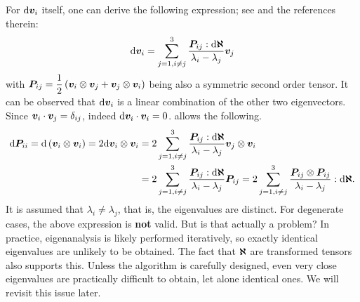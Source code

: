 For $\mathrm{d}\bm{v}_i$ itself, one can derive the following expression; see \cite{Wu2006} and the references therein:
\begin{gather}\label{eq:eigenvector_diff_def}
    \mathrm{d}\bm{v}_i=\sum_{j=1,i\neq{}j}^3\dfrac{\bm{P}_{ij}:\mathrm{d}\bm{\aleph}}{\lambda_i-\lambda_j}\bm{v}_j
\end{gather}
with $\bm{P}_{ij}=\dfrac{1}{2}\left(\bm{v}_i\otimes\bm{v}_j+\bm{v}_j\otimes\bm{v}_i\right)$ being also a symmetric second order tensor.
It can be observed that $ \mathrm{d}\bm{v}_i$ is a linear combination of the other two eigenvectors.
Since $\bm{v}_i\cdot\bm{v}_j=\delta_{ij}$, indeed $\mathrm{d}\bm{v}_i\cdot\bm{v}_i=0$.
 allows the following.
\begin{gather}
    \begin{split}
        \mathrm{d}\bm{P}_{ii}=\mathrm{d}\left(\bm{v}_i\otimes\bm{v}_i\right)=2\mathrm{d}\bm{v}_i\otimes\bm{v}_i & =2\sum_{j=1,i\neq{}j}^3\dfrac{\bm{P}_{ij}:\mathrm{d}\bm{\aleph}}{\lambda_i-\lambda_j}\bm{v}_j\otimes\bm{v}_i \\&=2\sum_{j=1,i\neq{}j}^3\dfrac{\bm{P}_{ij}:\mathrm{d}\bm{\aleph}}{\lambda_i-\lambda_j}\bm{P}_{ij}=2\sum_{j=1,i\neq{}j}^3\dfrac{\bm{P}_{ij}\otimes\bm{P}_{ij}}{\lambda_i-\lambda_j}:\mathrm{d}\bm{\aleph}.
    \end{split}
\end{gather}
It is assumed that $\lambda_i\neq\lambda_j$, that is, the eigenvalues are distinct.
For degenerate cases, the above expression is \textbf{not} valid.
But is that actually a problem?
In practice, eigenanalysis is likely performed iteratively, so exactly identical eigenvalues are unlikely to be obtained.
The fact that $\bm{\aleph}$ are transformed tensors also supports this.
Unless the algorithm is carefully designed, even very close eigenvalues are practically difficult to obtain, let alone identical ones.
We will revisit this issue later.
